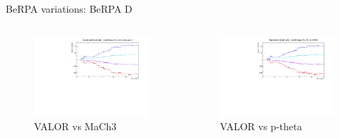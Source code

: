 \documentclass{beamer}
\begin{document}
\begin{frame}{BeRPA variations: BeRPA D}
	\centering
	\begin{columns}
		\begin{column}{0.5\paperwidth}
			\begin{figure}
				\includegraphics[page=9, trim={0cm 0cm 0cm 0cm}, clip, scale=0.35] {images/variations/valor_mach3/variations_prebanff_unosc_1Re}
				\caption{VALOR vs MaCh3}
			\end{figure}
		\end{column}
		\begin{column}{0.5\paperwidth}
			\begin{figure}
				\includegraphics[page=19, trim={0cm 0cm 0cm 0cm}, clip, scale=0.35] {images/variations/valor_ptheta/variations_prebanff_unosc_1Re}
				\caption{VALOR vs p-theta}
			\end{figure}
		\end{column}
	\end{columns}
\end{frame}
\end{document}
